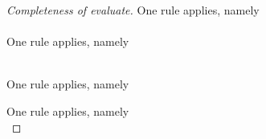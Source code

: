 \begin{proof}[Completeness of evaluate]
{    %
    }
       {One rule applies, namely\\ \\

      }
     {One rule applies, namely\\ \\

    }

    {One rule applies, namely \\
    }

    {One rule applies, namely \\
  }


\end{proof}
